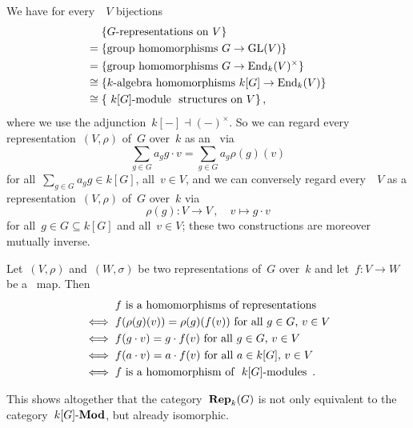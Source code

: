 \section{}

We have for every~{\kvs}~$V$ bijections
\begin{align*}
       {}&  \{ \text{$G$-representations on~$V$} \} \\
      ={}&  \{ \text{group homomorphisms~$G \to \GL(V)$} \} \\
      ={}&  \{ \text{group homomorphisms~$G \to \End_k(V)^\times$} \} \\
  \cong{}&  \{ \text{{\kalg} homomorphisms~$k[G] \to \End_k(V)$} \} \\
  \cong{}&  \{ \text{{\module{$k[G]$}} structures on~$V$} \} \,,
\end{align*}
where we use the adjunction~$k[-] \dashv (-)^\times$.
So we can regard every representation~$(V,\rho)$ of~$G$ over~$k$ as an~{} via
\[
    \sum_{g \in G} a_g g
    \cdot
    v
  = \sum_{g \in G} a_g \rho(g)(v)
\]
for all~$\sum_{g \in G} a_g g \in k[G]$, all~$v \in V$, and we can conversely regard every~{}~$V$ as a representation~$(V,\rho)$ of~$G$ over~$k$ via
\[
          \rho(g)
  \colon  V
  \to     V \,,
  \quad   v
  \mapsto g \cdot v
\]
for all~$g \in G \subseteq k[G]$ and all~$v \in V$;
these two constructions are moreover mutually inverse.

Let~$(V,\rho)$ and~$(W,\sigma)$ be two representations of~$G$ over~$k$ and let~$f \colon V \to W$ be a~{\klin} map.
Then
\begin{align*}
      {}& \text{$f$ is a homomorphisms of representations}  \\
  \iff{}& \text{$f(\rho(g)(v)) = \rho(g)(f(v))$ for all~$g \in G$,~$v \in V$} \\
  \iff{}& \text{$f(g \cdot v) = g \cdot f(v)$ for all~$g \in G$,~$v \in V$} \\
  \iff{}& \text{$f(a \cdot v) = a \cdot f(v)$ for all~$a \in k[G]$,~$v \in V$}  \\
  \iff{}& \text{$f$ is a homomorphism of~{\modules{$k[G]$}}} \,.
\end{align*}

This shows altogether that the category~$\mathbf{Rep}_{k}(G)$ is not only equivalent to the category~$\text{$k[G]$-$\mathbf{Mod}$}$, but already isomorphic.




